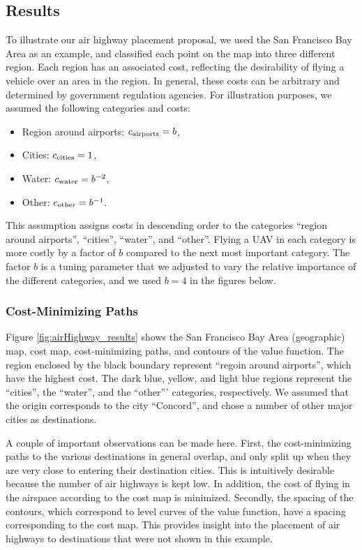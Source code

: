 \subsection{Results}
To illustrate our air highway placement proposal, we used the San Francisco Bay Area as an example, and classified each point on the map into three different region. Each region has an associated cost, reflecting the desirability of flying a vehicle over an area in the region. In general, these costs can be arbitrary and determined by government regulation agencies. For illustration purposes, we assumed the following categories and costs:

\begin{itemize}
\item Region around airports: $c_\text{airports}=b$,
\item Cities: $c_\text{cities}=1$,
\item Water: $c_\text{water}=b^{-2}$,
\item Other: $c_\text{other}=b^{-1}$.
\end{itemize}

This assumption assigns costs in descending order to the categories ``region around airports'', ``cities'', ``water'', and ``other''. Flying a UAV in each category is more costly by a factor of $b$ compared to the next most important category. The factor $b$ is a tuning parameter that we adjusted to vary the relative importance of the different categories, and we used $b=4$ in the figures below.

\subsubsection{Cost-Minimizing Paths}
Figure \ref{fig:airHighway_results} shows the San Francisco Bay Area (geographic) map, cost map, cost-minimizing paths, and contours of the value function. The region enclosed by the black boundary represent ``regoin around airports'', which have the highest cost. The dark blue, yellow, and light blue regions represent the ``cities'', the ``water'', and the ``other''' categories, respectively. We assumed that the origin corresponds to the city ``Concord'', and chose a number of other major cities as destinations.

A couple of important observations can be made here. First, the cost-minimizing paths to the various destinations in general overlap, and only split up when they are very close to entering their destination cities. This is intuitively desirable because the number of air highways is kept low. In addition, the cost of flying in the airspace according to the cost map is minimized. Secondly, the spacing of the contours, which correspond to level curves of the value function, have a spacing corresponding to the cost map. This provides insight into the placement of air highways to destinations that were not shown in this example.


